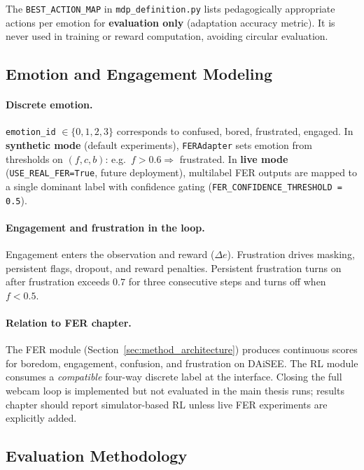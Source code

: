 The \texttt{BEST\_ACTION\_MAP} in \texttt{mdp\_definition.py} lists pedagogically appropriate actions per emotion for \textbf{evaluation only} (adaptation accuracy metric). It is never used in training or reward computation, avoiding circular evaluation.

\subsection{Emotion and Engagement Modeling}\label{sec:method_emotion_engagement}

\paragraph{Discrete emotion.}
\texttt{emotion\_id} $\in \{0,1,2,3\}$ corresponds to confused, bored, frustrated, engaged. In \textbf{synthetic mode} (default experiments), \texttt{FERAdapter} sets emotion from thresholds on $(f, c, b)$: e.g.\ $f>0.6 \Rightarrow$ frustrated. In \textbf{live mode} (\texttt{USE\_REAL\_FER=True}, future deployment), multilabel FER outputs are mapped to a single dominant label with confidence gating (\texttt{FER\_CONFIDENCE\_THRESHOLD = 0.5}).

\paragraph{Engagement and frustration in the loop.}
Engagement enters the observation and reward ($\Delta e$). Frustration drives masking, persistent flags, dropout, and reward penalties. Persistent frustration turns on after frustration exceeds $0.7$ for three consecutive steps and turns off when $f < 0.5$.

\paragraph{Relation to FER chapter.}
The FER module (Section~\ref{sec:method_architecture}) produces continuous scores for boredom, engagement, confusion, and frustration on DAiSEE. The RL module consumes a \emph{compatible} four-way discrete label at the interface. Closing the full webcam loop is implemented but not evaluated in the main thesis runs; results chapter should report simulator-based RL unless live FER experiments are explicitly added.

\subsection{Evaluation Methodology}\label{sec:method_eval}

